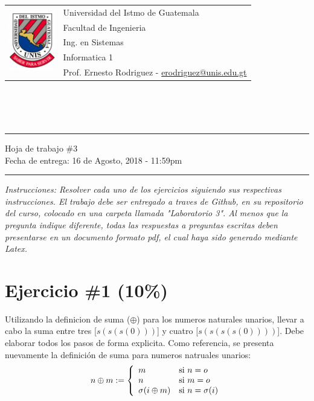 \documentclass{article}
\newcommand{\horrule}[1]{\rule{\linewidth}{#1}}
\begin{document}
\begin{tabular}{l l}
\multirow{5}{*}{\includegraphics[width=2cm]{../../recursos/logo.png}}
 & Universidad del Istmo de Guatemala \\
 & Facultad de Ingenieria \\
 & Ing. en Sistemas \\
 & Informatica 1 \\
 & Prof. Ernesto Rodriguez - \href{mailto:erodriguez@unis.edu.gt}{erodriguez@unis.edu.gt} \\
\end{tabular}
\\\\\\

\begin{center}
        \horrule{0.5pt}
        \huge{Hoja de trabajo \#3} \\
        \large{Fecha de entrega: 16 de Agosto, 2018 - 11:59pm} \\
        \horrule{1pt}
\end{center}

\emph{Instrucciones: Resolver cada uno de los ejercicios siguiendo sus respectivas
instrucciones. El trabajo debe ser entregado a traves de Github, en su repositorio del curso, colocado en una carpeta llamada "Laboratorio 3".
Al menos que la pregunta indique diferente, todas las respuestas a preguntas escritas deben presentarse en
un documento formato pdf, el cual haya sido generado mediante Latex. }

\section*{Ejercicio \#1 (10\%)}
Utilizando la definicion de suma ($\oplus$) para los numeros naturales unarios, llevar
a cabo la suma entre tres [$s(s(s(0)))$] y cuatro [$s(s(s(s(0))))$]. Debe elaborar todos
los pasos de forma explicita. Como referencia, se presenta nuevamente la definici\'on de
suma para numeros natruales unarios:
\[
        n\oplus m := \left\{
        \begin{array}{l l}
            m & \mbox{si } n=o \\
            n & \mbox{si } m=o \\
            \sigma(i\oplus m) & \mbox{si } n=\sigma(i) \\
        \end{array}
        \right.
    \]
\end{document}
